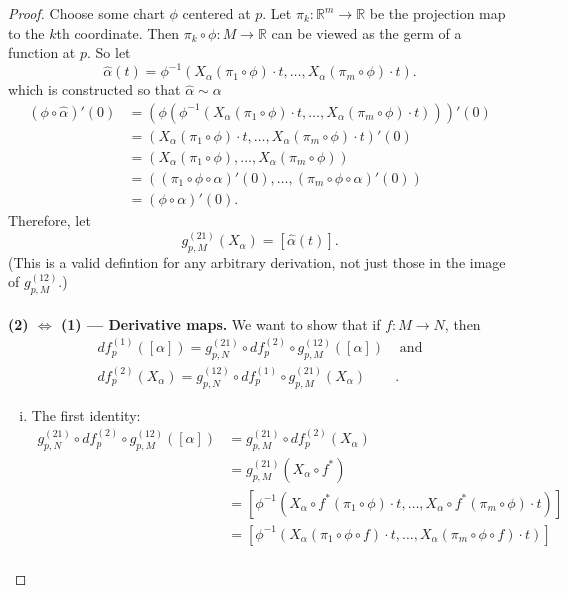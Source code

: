 \documentclass{article}
\begin{document}
\begin{proof}
  Choose some chart $\phi$ centered at $p$.
  Let $\pi_k:\mathbb{R}^m\rightarrow\mathbb{R}$ be the projection map to the
  $k$th coordinate. Then $\pi_k \circ \phi: M \rightarrow \mathbb{R}$ can be
  viewed as the germ of a function at $p$. So let \[
    \hat{\alpha}(t) = \phi^{-1}(X_\alpha(\pi_1 \circ \phi) \cdot t, \hdots, X_\alpha(\pi_m \circ \phi) \cdot t).
  \] which is constructed so that $\hat{\alpha} \sim \alpha$ \begin{align*}
    (\phi \circ \hat{\alpha})'(0) &= (\phi(\phi^{-1}(X_\alpha(\pi_1 \circ \phi) \cdot t, \hdots, X_\alpha(\pi_m \circ \phi) \cdot t)))'(0) \\
    &= (X_\alpha(\pi_1 \circ \phi) \cdot t, \hdots, X_\alpha(\pi_m \circ \phi) \cdot t)'(0)\\
    &= (X_\alpha(\pi_1 \circ \phi), \hdots, X_\alpha(\pi_m \circ \phi))\\
    &= ((\pi_1 \circ \phi \circ \alpha)'(0), \hdots, (\pi_m \circ \phi \circ \alpha)'(0))\\
    &= (\phi \circ \alpha)'(0).
  \end{align*}
  Therefore, let \[
    g_{p,M}^{(21)}(X_\alpha) = [\hat{\alpha}(t)].
  \] (This is a valid defintion for any arbitrary derivation, not just those in
  the image of $g_{p,M}^{(12)}$.)
%
\\~\\
  \textbf{(2) $\Longleftrightarrow$ (1) --- Derivative maps.}
  We want to show that if $f\colon M \rightarrow N$, then \begin{align*}
    df_p^{(1)}([\alpha]) = g_{p,N}^{(21)} \circ df_p^{(2)} \circ g_{p,M}^{(12)}([\alpha])& \text{ and}\\
    df_p^{(2)}(X_\alpha) = g_{p,N}^{(12)} \circ df_p^{(1)} \circ g_{p,M}^{(21)}(X_\alpha)&.
  \end{align*}
  \begin{enumerate}[(i)]
    \item The first identity:
      \begin{align*}
        g_{p,N}^{(21)} \circ df_p^{(2)} \circ g_{p,M}^{(12)}([\alpha])
        &= g_{p,M}^{(21)} \circ df_p^{(2)}(X_\alpha) \\
        &= g_{p,M}^{(21)}(X_\alpha \circ f^*) \\
        &= [\phi^{-1}(X_\alpha \circ f^*(\pi_1 \circ \phi) \cdot t, \hdots, X_\alpha \circ f^*(\pi_m \circ \phi) \cdot t)] \\
        &= [\phi^{-1}(X_\alpha(\pi_1 \circ \phi \circ f) \cdot t, \hdots, X_\alpha(\pi_m \circ \phi \circ f) \cdot t)] \\

\end{align*}
\end{enumerate}
\end{proof}
\end{document}
